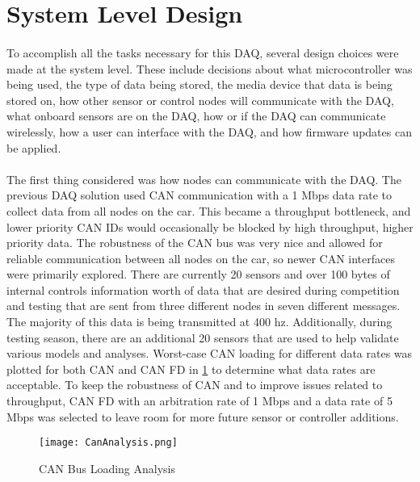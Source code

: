\section{System Level Design}

\paragraph{}
To accomplish all the tasks necessary for this DAQ, several design choices were made at the system level.
These include decisions about what microcontroller was being used, the type of data being stored, the media device that data is being stored on, how other sensor or control nodes will communicate with the DAQ, what onboard sensors are on the DAQ, how or if the DAQ can communicate wirelessly, how a user can interface with the DAQ, and how firmware updates can be applied.

\paragraph{}
The first thing considered was how nodes can communicate with the DAQ.
The previous DAQ solution used CAN communication with a 1 Mbps data rate to collect data from all nodes on the car.
This became a throughput bottleneck, and lower priority CAN IDs would occasionally be blocked by high throughput, higher priority data.
The robustness of the CAN bus was very nice and allowed for reliable communication between all nodes on the car, so newer CAN interfaces were primarily explored.
There are currently 20 sensors and over 100 bytes of internal controls information worth of data that are desired during competition and testing that are sent from three different nodes in seven different messages.
The majority of this data is being transmitted at 400 hz.
Additionally, during testing season, there are an additional 20 sensors that are used to help validate various models and analyses.
Worst-case CAN loading for different data rates was plotted for both CAN and CAN FD in \cref{fig:CANAnalysis} to determine what data rates are acceptable.
To keep the robustness of CAN and to improve issues related to throughput, CAN FD with an arbitration rate of 1 Mbps and a data rate of 5 Mbps was selected to leave room for more future sensor or controller additions.

\begin{figure}[H]
	\centering
	\texttt{[image: CanAnalysis.png]}
	\caption{CAN Bus Loading Analysis}
	\label{fig:CANAnalysis}
\end{figure}

